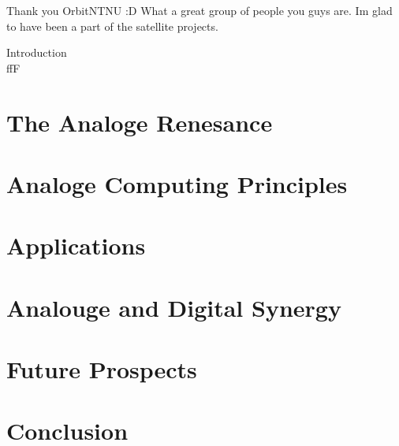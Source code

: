\documentclass{report}
\begin{document}
Thank you OrbitNTNU :D What a great group of people you guys are. Im glad to have been a part of the satellite projects. \lipsum[1]

\newpage
\Large{Introduction}\\
\lipsum[1-2]ffF

\chapter{The Analoge Renesance}


\chapter{Analoge Computing Principles}


\chapter{Applications}


\chapter{Analouge and Digital Synergy}


\chapter{Future Prospects}


\chapter{Conclusion}



\newpage
{}
\end{document}
